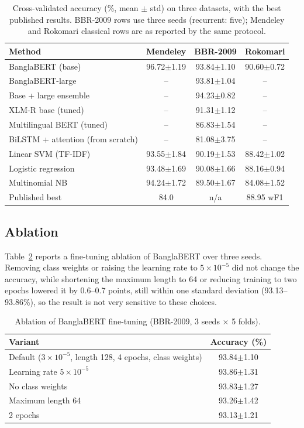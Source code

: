 \documentclass[journal]{IEEEtran}
\newcommand{\pmstd}[2]{#1$\pm$#2}
\begin{document}
\begin{table}[t]
\centering
\caption{Cross-validated accuracy (\%, mean $\pm$ std) on three datasets, with the best published results. BBR-2009 rows use three seeds (recurrent: five); Mendeley and Rokomari classical rows are as reported by the same protocol.}
\label{tab:main}
\small
\begin{tabular}{lccc}
\toprule
Method & Mendeley & BBR-2009 & Rokomari \\
\midrule
BanglaBERT (base) & \pmstd{96.72}{1.19} & \pmstd{93.84}{1.10} & \pmstd{90.60}{0.72} \\
BanglaBERT-large & -- & \pmstd{93.81}{1.04} & -- \\
Base + large ensemble & -- & \pmstd{94.23}{0.82} & -- \\
XLM-R base (tuned) & -- & \pmstd{91.31}{1.12} & -- \\
Multilingual BERT (tuned) & -- & \pmstd{86.83}{1.54} & -- \\
BiLSTM + attention (from scratch) & -- & \pmstd{81.08}{3.75} & -- \\
Linear SVM (TF-IDF) & \pmstd{93.55}{1.84} & \pmstd{90.19}{1.53} & \pmstd{88.42}{1.02} \\
Logistic regression & \pmstd{93.48}{1.69} & \pmstd{90.08}{1.66} & \pmstd{88.16}{0.94} \\
Multinomial NB & \pmstd{94.24}{1.72} & \pmstd{89.50}{1.67} & \pmstd{84.08}{1.52} \\
\midrule
Published best & 84.0 \cite{hossain2020} & n/a & 88.95 wF1 \cite{sarker2022} \\
\bottomrule
\end{tabular}
\end{table}

\subsection{Ablation}
Table~\ref{tab:abl} reports a fine-tuning ablation of BanglaBERT over three seeds. Removing class weights or raising the learning rate to $5\times10^{-5}$ did not change the accuracy, while shortening the maximum length to 64 or reducing training to two epochs lowered it by 0.6--0.7 points, still within one standard deviation (93.13--93.86\%), so the result is not very sensitive to these choices.

\begin{table}[t]
\centering
\caption{Ablation of BanglaBERT fine-tuning (BBR-2009, 3 seeds $\times$ 5 folds).}
\label{tab:abl}
\small
\begin{tabular}{lc}
\toprule
Variant & Accuracy (\%) \\
\midrule
Default ($3\times10^{-5}$, length 128, 4 epochs, class weights) & \pmstd{93.84}{1.10} \\
Learning rate $5\times10^{-5}$ & \pmstd{93.86}{1.31} \\
No class weights & \pmstd{93.83}{1.27} \\
Maximum length 64 & \pmstd{93.26}{1.42} \\
2 epochs & \pmstd{93.13}{1.21} \\
\bottomrule
\end{tabular}
\end{table}
\end{document}
